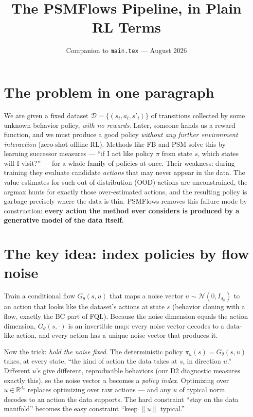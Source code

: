 \documentclass[11pt]{article}
\title{The PSMFlows Pipeline, in Plain RL Terms}
\author{}
\date{Companion to \texttt{main.tex} --- August 2026}
\newcommand{\D}{\mathcal{D}}
\newcommand{\R}{\mathbb{R}}
\begin{document}
\maketitle

\section{The problem in one paragraph}

We are given a fixed dataset $\D=\{(s_i,a_i,s'_i)\}$ of transitions collected by some
unknown behavior policy, \emph{with no rewards}. Later, someone hands us a reward
function, and we must produce a good policy \emph{without any further environment
interaction} (zero-shot offline RL). Methods like FB and PSM solve this by learning
successor measures --- ``if I act like policy $\pi$ from state $s$, which states will I
visit?'' --- for a whole family of policies at once. Their weakness: during training they
evaluate candidate \emph{actions} that may never appear in the data. The value estimates
for such out-of-distribution (OOD) actions are unconstrained, the argmax hunts for
exactly those over-estimated actions, and the resulting policy is garbage precisely where
the data is thin. PSMFlows removes this failure mode by construction: \textbf{every
action the method ever considers is produced by a generative model of the data itself.}

\section{The key idea: index policies by flow noise}

Train a conditional flow $G_\theta(s,u)$ that maps a noise vector
$u\sim\mathcal{N}(0,I_{d_a})$ to an action that looks like the dataset's actions at state
$s$ (behavior cloning with a flow, exactly the BC part of FQL). Because the noise
dimension equals the action dimension, $G_\theta(s,\cdot)$ is an invertible map: every
noise vector decodes to a data-like action, and every action has a unique noise vector
that produces it.

Now the trick: \emph{hold the noise fixed}. The deterministic policy
$\pi_u(s)=G_\theta(s,u)$ takes, at every state, ``the kind of action the data takes at
$s$, in direction $u$.'' Different $u$'s give different, reproducible behaviors (our D2
diagnostic measures exactly this), so the noise vector $u$ becomes a \emph{policy index}.
Optimizing over $u\in\R^{d_a}$ replaces optimizing over raw actions --- and any $u$ of
typical norm decodes to an action the data supports. The hard constraint ``stay on the
data manifold'' becomes the easy constraint ``keep $\|u\|$ typical.''
\end{document}
